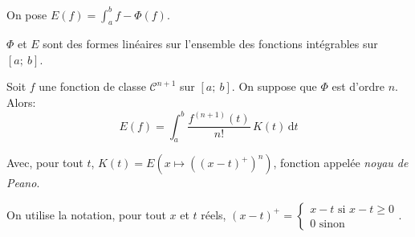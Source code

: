 \begin{de}
On pose $E(f) = \displaystyle{\int_{a}^{b}} f - \Phi(f)$.
\end{de}

\begin{listremarques}
\item
$\Phi$ et $E$ sont des formes linéaires sur l'ensemble des fonctions intégrables sur $[a;~b]$.
\end{listremarques}


\begin{prop}
Soit $f$ une fonction de classe $\mathcal{C}^{n+1}$ sur $[a;~b]$. On suppose que $\Phi$ est d'ordre $n$. Alors:
\[
E(f) = \displaystyle{\int_a^b} \frac{f^{(n+1)}(t)}{n!} \, K(t) \, \mathrm d t
\]

Avec, pour tout $t$, $K(t) = E\left ( x \mapsto \left ((x-t)^+\right )^n \right )$, fonction appelée \emph{noyau de Peano}.

\medskip
On utilise la notation, pour tout $x$ et $t$ réels, $(x-t)^+ = \begin{cases}x-t  \text{ si } x-t \geq 0 \\
0 \text{ sinon}
\end{cases}$.
\end{prop}

